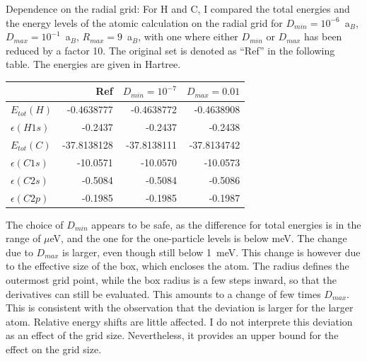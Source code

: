 \documentclass[11pt,a4paper]{report}
\begin{document}
Dependence on the radial grid: For H and C, I compared the total
energies and the energy levels of the atomic calculation on the radial
grid for $D_{min}=10^{-6}$~a$_B$, $D_{max}=10^{-1}$~a$_B$,
$R_{max}=9$~a$_B$, with one where either $D_{min}$ or $D_{max}$ has
been reduced by a factor 10. The original set is denoted as ``Ref'' in
the following table. The energies are given in Hartree.
\begin{center}
\begin{tabular}{|l|r|r|r|}
\hline
      & Ref & $D_{min}=10^{-7}$ & $D_{max}=0.01$ \\
\hline
$E_{tot}(H)$     & -0.4638777  & -0.4638772 & -0.4638908\\
$\epsilon(H1s)$ &  -0.2437    & -0.2437    &  -0.2438 \\
$E_{tot}(C)$     &-37.8138128  &-37.8138111 & -37.8134742\\
$\epsilon(C1s)$ & -10.0571    & -10.0570   & -10.0573 \\
$\epsilon(C2s)$ &  -0.5084    & -0.5084    & -0.5086 \\
$\epsilon(C2p)$ & -0.1985     &  -0.1985   & -0.1987\\
\hline
\end{tabular}
\end{center}
The choice of $D_{min}$ appears to be safe, as the difference for
total energies is in the range of $\mu$eV, and the one for the
one-particle levels is below meV. The change due to $D_{max}$ is
larger, even though still below 1~meV. This change is however due to
the effective size of the box, which encloses the atom. The radius
defines the outermost grid point, while the box radius is a few steps
inward, so that the derivatives can still be evaluated. This amounts
to a change of few times $D_{max}$. This is consistent with the
observation that the deviation is larger for the larger atom. Relative
energy shifts are little affected. I do not interprete this deviation
as an effect of the grid size. Nevertheless, it provides an upper
bound for the effect on the grid size.
\end{document}
